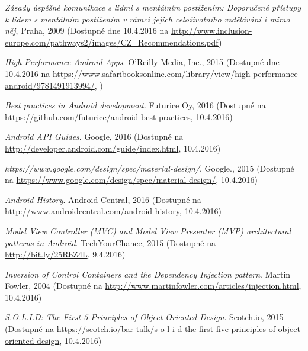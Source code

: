\documentclass[czech,master,public,dept460,male,java,cpdeclaration]{diploma}
\begin{document}
\begin{thebibliography}{99}


\textit{Zásady úspěšné komunikace s lidmi s mentálním postižením: Doporučené přístupy k lidem
s mentálním postižením v rámci jejich celoživotního vzdělávání i mimo něj}, {Praha, 2009}
\newline
(Dostupné dne 10.4.2016 na \url{http://www.inclusion-europe.com/pathways2/images/CZ_Recommendations.pdf})


\textit{High Performance Android Apps}. {O'Reilly Media, Inc., 2015}
\newline(Dostupné dne 10.4.2016 na \url{https://www.safaribooksonline.com/library/view/high-performance-android/9781491913994/}, )

\textit{Best practices in Android development}. {Futurice Oy, 2016}
\newline(Dostupné na \url{https://github.com/futurice/android-best-practices}, 10.4.2016)


\textit{Android API Guides}. {Google, 2016}
\newline(Dostupné na \url{http://developer.android.com/guide/index.html}, 10.4.2016)

\textit{https://www.google.com/design/spec/material-design/}. {Google., 2015}
\newline(Dostupné na \url{https://www.google.com/design/spec/material-design/}, 10.4.2016)

\textit{Android History}. {Android Central, 2016}
\newline(Dostupné na \url{http://www.androidcentral.com/android-history}, 10.4.2016)

\textit{Model View Controller (MVC) and Model View Presenter (MVP) architectural patterns in Android}. {TechYourChance, 2015}
\newline(Dostupné na \url{http://bit.ly/25RbZ4L}, 9.4.2016)

\textit{Inversion of Control Containers and the Dependency Injection pattern}. {Martin Fowler, 2004}
\newline(Dostupné na \url{http://www.martinfowler.com/articles/injection.html}, 10.4.2016)

\textit{S.O.L.I.D: The First 5 Principles of Object Oriented Design}. {Scotch.io, 2015}
\newline(Dostupné na \url{https://scotch.io/bar-talk/s-o-l-i-d-the-first-five-principles-of-object-oriented-design}, 10.4.2016)


\end{thebibliography}
\end{document}
